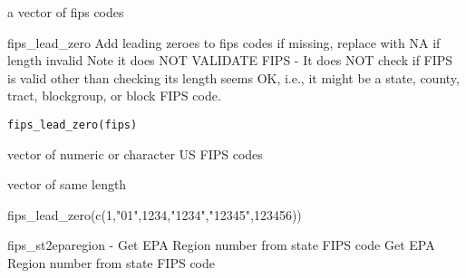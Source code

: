 \documentclass[a4paper]{book}
\begin{document}
%
\begin{Value}
a vector of fips codes
\end{Value}
%
\begin{SeeAlso}\relax
{}   
\end{SeeAlso}
%
\begin{Description}\relax
fips\_lead\_zero
Add leading zeroes to fips codes if missing, replace with NA if length invalid
Note it does NOT VALIDATE FIPS -
It does NOT check if FIPS is valid other than checking its length seems OK,
i.e., it might be a state, county, tract, blockgroup, or block FIPS code.
\end{Description}
%
\begin{Usage}
\begin{verbatim}
fips_lead_zero(fips)
\end{verbatim}
\end{Usage}
%
\begin{Arguments}
\begin{ldescription}
\item[\code{fips}] vector of numeric or character US FIPS codes
\end{ldescription}
\end{Arguments}
%
\begin{Value}
vector of same length
\end{Value}
%
\begin{Examples}
\begin{ExampleCode}
fips_lead_zero(c(1,"01",1234,"1234","12345",123456))
\end{ExampleCode}
\end{Examples}
%
\begin{Description}\relax
fips\_st2eparegion - Get EPA Region number from state FIPS code
Get EPA Region number from state FIPS code
\end{Description}
\end{document}
